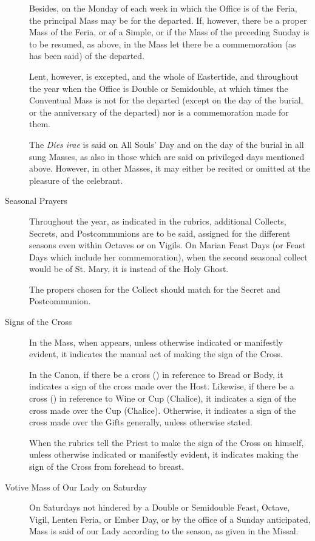 \begin{description}
    Besides, on the Monday of each week in which the Office is of the Feria, the principal Mass may be for the departed. If, however, there be a proper Mass of the Feria, or of a Simple, or if the Mass of the preceding Sunday is to be resumed, as above, in the Mass let there be a commemoration (as has been said) of the departed.\par
    Lent, however, is excepted, and the whole of Eastertide, and throughout the year when the Office is Double or Semidouble, at which times the Conventual Mass is not for the departed (except on the day of the burial, or the anniversary of the departed) nor is a commemoration made for them.\par
    The \emph{Dies irae} is said on All Souls' Day and on the day of the burial in all sung Masses, as also in those which are said on privileged days mentioned above. However, in other Masses, it may either be recited or omitted at the pleasure of the celebrant.
    \item[Seasonal Prayers] Throughout the year, as indicated in the rubrics, additional Collects, Secrets, and Postcommunions are to be said, assigned for the different seasons even within Octaves or on Vigils. On Marian Feast Days (or Feast Days which include her commemoration), when the second seasonal collect would be of St. Mary, it is instead of the Holy Ghost.\par
    The propers chosen for the Collect should match for the Secret and Postcommunion.
    \item[Signs of the Cross] In the Mass, when {} appears, unless otherwise indicated or manifestly evident, it indicates the manual act of making the sign of the Cross.\par
    In the Canon, if there be a cross ({}) in reference to Bread or Body, it indicates a sign of the cross made over the Host. Likewise, if there be a cross ({}) in reference to Wine or Cup (Chalice), it indicates a sign of the cross made over the Cup (Chalice). Otherwise, it indicates a sign of the cross made over the Gifts generally, unless otherwise stated.\par
    When the rubrics tell the Priest to make the sign of the Cross on himself, unless otherwise indicated or manifestly evident, it indicates making the sign of the Cross from forehead to breast.
    \item[Votive Mass of Our Lady on Saturday] On Saturdays not hindered by a Double or Semidouble Feast, Octave, Vigil, Lenten Feria, or Ember Day, or by the office of a Sunday anticipated, Mass is said of our Lady according to the season, as given in the Missal.\par
\end{description}
\newpage
